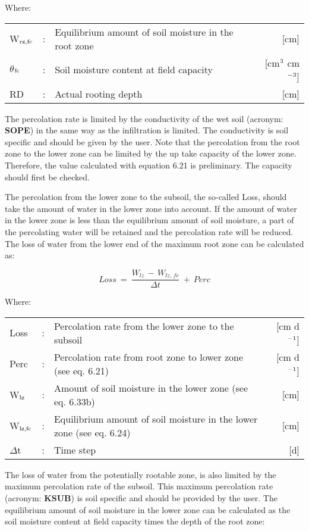 Where:\\[5pt]
\begin{tabularx}{\textwidth}{llXr}
W$_{{\rm rz,fc}}$ &:& Equilibrium amount of soil moisture in the root zone  & [cm]\\
$\theta$$_{{\rm fc}}$ &:& Soil moisture content at field capacity  & [cm$^{{\rm 3}}$ cm$^{{\rm -3}}$]\\
RD &:& Actual rooting depth  & [cm]\\
\end{tabularx}



The percolation rate is limited by the conductivity of the wet soil (acronym: {\bf SOPE}) in the
same way as the infiltration is limited. The conductivity is soil specific and should be
given by the user. Note that the percolation from the root zone to the lower zone can be
limited by the up take capacity of the lower zone. Therefore, the value calculated with 
equation 6.21 is preliminary. The capacity should first be checked.

The percolation from the lower zone to the subsoil, the so-called Loss, should take the
amount of water in the lower zone into account. If the amount of water in the lower zone
is less than the equilibrium amount of soil moisture, a part of the percolating water will
be retained and the percolation rate will be reduced. The loss of water from the lower end
of the maximum root zone can be calculated as:

\begin{equation}
Loss ~=~{\frac{W _{lz} \, -\, W _{lz,\, fc} }{\Delta t}} ~+~ Perc
\end{equation}

Where:\\[5pt]
\begin{tabularx}{\textwidth}{llXr}
Loss &:& Percolation rate from the lower zone to the subsoil   & [cm d$^{{\rm -1}}$]\\
Perc &:& Percolation rate from root zone to lower zone (see eq. 6.21)  & [cm d$^{{\rm -1}}$]\\
W$_{{\rm lz}}$ &:& Amount of soil moisture in the lower zone (see eq. 6.33b)  & [cm]\\
W$_{{\rm lz,fc}}$ &:& Equilibrium amount of soil moisture in the
   lower zone (see eq. 6.24)  & [cm]\\
$\Delta$t &:& Time step   & [d]\\
\end{tabularx}

The loss of water from the potentially rootable zone, is also limited by the maximum
percolation rate of the subsoil. This maximum percolation rate (acronym: {\bf KSUB}) is soil
specific and should be provided by the user. The equilibrium amount of soil moisture in
the lower zone can be calculated as the soil moisture content at field capacity times the
depth of the root zone:

